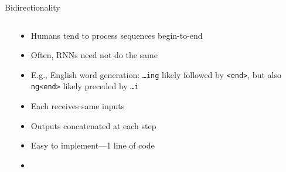 \begin{frame}{Bidirectionality}
    \begin{columns}
        \begin{column}{0.53\textwidth}
            
        \end{column}
        \begin{column}{0.47\textwidth}
            \begin{itemize}[<.->]
                \item<+-> Humans tend to process sequences begin-to-end
                \item Often, RNN{}s need not do the same
                \item E.g., English word generation: \texttt{\ldots{}ing} likely followed by \texttt{<end>}, but also \texttt{ng<end>} likely preceded by \texttt{\ldots{}i}
            \end{itemize}
            \begin{itemize}[<.->]
                \item Each receives same inputs
                \item Outputs concatenated at each step
                \item Easy to implement---1 line of code
                \item \citet{SchusterIEEESP97}
            \end{itemize}
        \end{column}
    \end{columns}
\end{frame}

